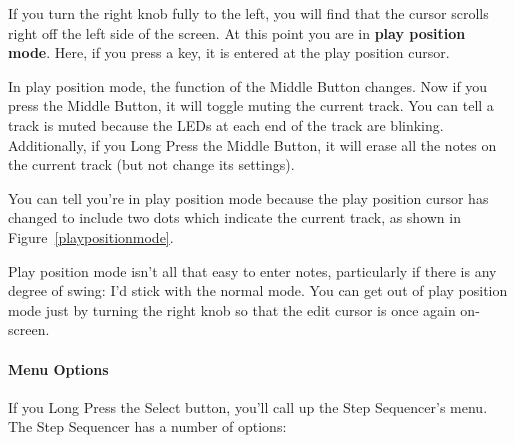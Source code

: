 \documentclass{article}
\begin{document}
If you turn the right knob fully to the left, you will find that the cursor scrolls right off the left side of the screen.  At this point you are in {\bf play position mode}.  Here, if you press a key, it is entered at the play position cursor.

In play position mode, the function of the Middle Button changes.  Now if you press the Middle Button, it will toggle muting the current track.  You can tell a track is muted because the LEDs at each end of the track are blinking.  Additionally, if you Long Press the Middle Button, it will erase all the notes on the current track (but not change its settings).

You can tell you're in play position mode because the play position cursor has changed to include two dots which indicate the current track, as shown in Figure~\ref{playpositionmode}.

Play position mode isn't all that easy to enter notes, particularly if there is any degree of swing: I'd stick with the normal mode.  You can get out of play position mode just by turning the right knob so that the edit cursor is once again on-screen.

\paragraph{Menu Options}

If you Long Press the Select button, you'll call up the Step Sequencer's menu.  The Step Sequencer has a number of options:
\end{document}
